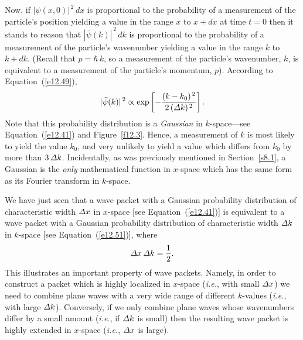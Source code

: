 Now, if $|\psi(x,0)|^{\,2}\,dx$ is proportional to the probability  of a measurement of  the
particle's position yielding a value in the range $x$ to $x+dx$ at time $t=0$ then it stands to reason that $|\bar{\psi}(k)|^{\,2}\,dk$
is proportional to the probability  of a measurement of the
particle's wavenumber yielding a value in the range $k$ to $k+dk$. (Recall that $p = \hbar\,k$,
so a measurement of the particle's wavenumber, $k$, is equivalent to a measurement of the particle's
momentum, $p$). According to Equation~(\ref{e12.49}),
\begin{equation}\label{e12.51}
|\bar{\psi}(k)|^{\,2} \propto \exp\left[- \frac{(k-k_0)^{\,2}}{2\,({\mit\Delta}k)^{\,2}}\right].
\end{equation}
Note that this probability distribution is a {\em Gaussian}\/ in $k$-space---see
Equation~(\ref{e12.41}) and Figure~\ref{f12.3}. Hence, a measurement of $k$ is
most likely to yield the value $k_0$, and very unlikely to yield
a value which differs from $k_0$ by more than
$3\,{\mit\Delta}k$. Incidentally,  as was previously mentioned in Section~\ref{s8.1},  a Gaussian is the {\em only}\/ mathematical function
in $x$-space which has the same form as its Fourier transform in $k$-space.

We have just seen that a wave packet with a Gaussian probability distribution of characteristic
width ${\mit\Delta} x$ in $x$-space [see Equation~(\ref{e12.41})] is equivalent  to a wave packet with a Gaussian probability distribution of characteristic width
${\mit\Delta} k$ in $k$-space [see Equation~(\ref{e12.51})],
where
\begin{equation}
{\mit\Delta}x\,{\mit\Delta} k = \frac{1}{2}.
\end{equation}
This illustrates an important property of wave packets. Namely, in order to
construct a packet which is highly localized in $x$-space ({\em i.e.}, with small ${\mit\Delta}x$)  we need
to combine plane waves with a very wide range of different $k$-values
({\em i.e.}, with large ${\mit\Delta}k$). Conversely, if we only combine
plane waves whose wavenumbers differ by a small amount ({\em i.e.}, if
${\mit\Delta}k$ is small) then the resulting wave packet is highly 
extended in $x$-space ({\em i.e.}, ${\mit\Delta}x$ is large).

